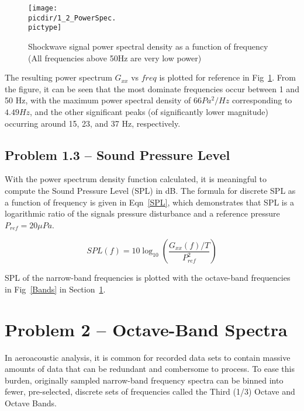 \documentclass[twocolumn,10pt]{asme2ej}
\begin{document}
\begin{figure}[htb]
\begin{center}
\texttt{[image: \\picdir/1\_2\_PowerSpec.\\pictype]}
\caption{Shockwave signal power spectral density as a function of frequency (All frequencies above 50Hz are very low power)}
\label{PowSpec}
\end{center}
\end{figure}

The resulting power spectrum $G_{xx}$ vs $freq$ is plotted for reference in Fig~\ref{PowSpec}.  From the figure, it can be seen that the most dominate frequencies occur between 1 and 50 Hz, with the maximum power spectral density of $66 Pa^2\text{/}Hz$ corresponding to $4.49Hz$, and the other significant peaks (of significantly lower magnitude) occurring around 15, 23, and 37 Hz, respectively.

\subsection{Problem 1.3 -- Sound Pressure Level}

With the power spectrum density function calculated, it is meaningful to compute the Sound Pressure Level (SPL) in dB.  The formula for discrete SPL as a function of frequency is given in Eqn~\ref{SPL}, which demonstrates that SPL is a logarithmic ratio of the signal\textquotesingle s pressure disturbance and a reference pressure $P_{ref}=20\mu Pa$.

\begin{equation} \label{SPL}
SPL(f) = 10\log_{10}\left( \dfrac{G_{xx}(f) / T}{P_{ref}^2} \right)
\end{equation}

SPL of the narrow-band frequencies is plotted with the octave-band frequencies in Fig~\ref{Bands} in Section~\ref{sect_oct}.


\section{Problem 2 -- Octave-Band Spectra} \label{sect_oct}

In aeroacoustic analysis, it is common for recorded data sets to contain massive amounts of data that can be redundant and combersome to process.  To ease this burden, originally sampled narrow-band frequency spectra can be binned into fewer, pre-selected, discrete sets of frequencies called the Third (1/3) Octave and Octave Bands.
\end{document}
